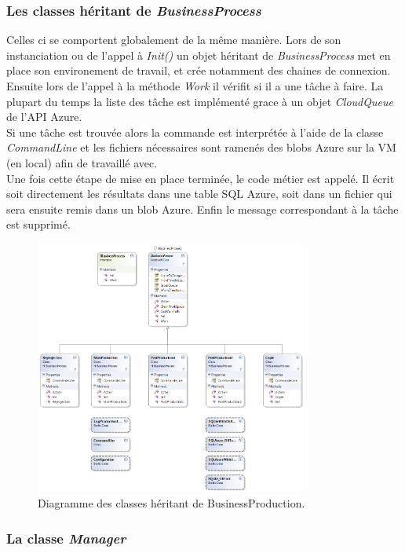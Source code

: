 \subsubsection{Les classes héritant de \textit{BusinessProcess}}
Celles ci se comportent globalement de la même manière. Lors de son
instanciation ou de l'appel à \textit{Init()} un objet héritant de
\textit{BusinessProcess} met en place son environement de travail, et
crée notamment des chaines de connexion. Ensuite lors de l'appel à la
méthode \textit{Work} il vérifit si il a une tâche à faire. La plupart
du temps la liste des tâche est implémenté grace à un objet
\textit{CloudQueue} de l'API Azure. \\

Si une tâche est trouvée alors la commande est interprétée à l'aide de
la classe \textit{CommandLine} et les fichiers nécessaires sont
ramenés des blobs Azure sur la VM (en local) afin de travaillé avec.\\

Une fois cette étape de mise en place terminée, le code métier est
appelé. Il écrit soit directement les résultats dans une table SQL
Azure, soit dans un fichier qui sera ensuite remis dans un blob Azure.
Enfin le message correspondant à la tâche est supprimé.

\begin{figure}[h!]
  \caption{Diagramme des classes héritant de BusinessProduction.}
  \centering
    \includegraphics[width=0.8\textwidth]{images/BusinessProduction2.png}
\end{figure}
\subsubsection{La classe \textit{Manager}}

